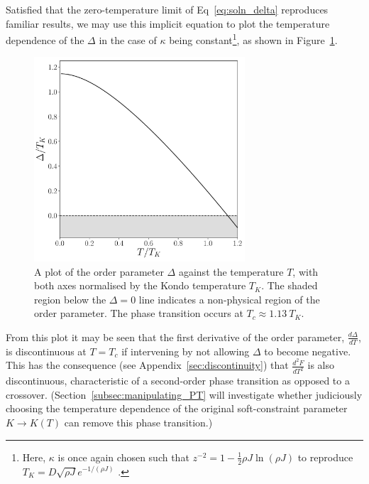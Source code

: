 Satisfied that the zero-temperature limit of Eq~\eqref{eq:soln_delta} reproduces familiar results, we may use this implicit equation to plot the temperature dependence of the $ \Delta $ in the case of $ \kappa $ being constant\footnote{Here, $ \kappa $ is once again chosen such that $ z^{-2} = 1 - \frac{1}{2} \rho J \ln{(\rho J)} $ to reproduce $ T_K = D \sqrt{\rho J} e^{-1 / (\rho J)} $ \cite{Draft}.}, as shown in Figure~\ref{fig:delta_vs_T}.

\begin{figure}
\centering
\includegraphics[width=0.7\textwidth]{Figures/delta_vs_T.pdf}
\caption{A plot of the order parameter $ \Delta $ against the temperature $ T $, with both axes normalised by the Kondo temperature $ T_K $. The shaded region below the $ \Delta = 0 $ line indicates a non-physical region of the order parameter. The phase transition occurs at $ T_c \approx 1.13 ~ T_K $.}
\label{fig:delta_vs_T}
\end{figure}

From this plot it may be seen that the first derivative of the order parameter, $ \frac{d \Delta}{d T} $, is discontinuous at $ T = T_c $ if intervening by not allowing $ \Delta $ to become negative. This has the consequence (see Appendix~\ref{sec:discontinuity}) that $ \frac{d^2 F}{d T^2} $ is also discontinuous, characteristic of a second-order phase transition as opposed to a crossover. (Section~\ref{subsec:manipulating_PT} will investigate whether judiciously choosing the temperature dependence of the original soft-constraint parameter $ K \rightarrow K(T) $ can remove this phase transition.)


